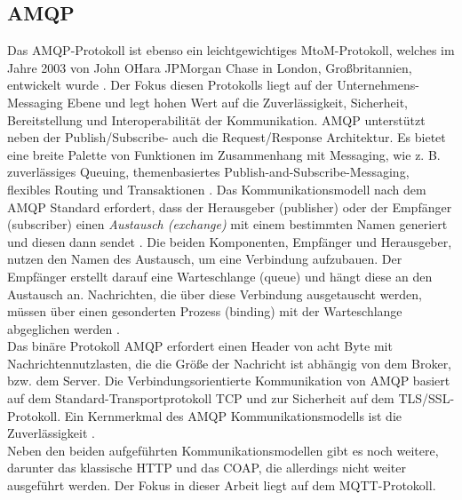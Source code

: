    \subsection{AMQP}
    \label{subsec:amqp}
        Das \ac{AMQP}-Protokoll ist ebenso ein leichtgewichtiges \acs{MtoM}-Protokoll, welches im Jahre 2003 von John O\'Hara JPMorgan Chase 
        in London, Großbritannien, entwickelt wurde \cite{Naik2017}. Der Fokus diesen Protokolls liegt auf der Unternehmens-Messaging Ebene 
        und legt hohen Wert auf die Zuverlässigkeit, Sicherheit, Bereitstellung und Interoperabilität der Kommunikation. \acs{AMQP} 
        unterstützt neben der Publish/Subscribe- auch die Request/Response Architektur. Es bietet eine breite Palette von 
        Funktionen im Zusammenhang mit Messaging, wie z. B. zuverlässiges Queuing, themenbasiertes Publish-and-Subscribe-Messaging, 
        flexibles Routing und Transaktionen \cite{Naik2017}. Das Kommunikationsmodell nach dem \acs{AMQP} Standard erfordert, dass der 
        Herausgeber (publisher) oder der Empfänger (subscriber) einen \textit{Austausch (exchange)} mit einem bestimmten Namen generiert 
        und diesen dann sendet \cite{Naik2017}. Die beiden Komponenten, Empfänger und Herausgeber, nutzen den Namen des Austausch, um eine 
        Verbindung aufzubauen. Der Empfänger erstellt darauf eine Warteschlange (queue) und hängt diese an den Austausch an. Nachrichten, die 
        über diese Verbindung ausgetauscht werden, müssen über einen gesonderten Prozess (binding) mit der Warteschlange abgeglichen werden 
        \cite{Naik2017}.
        \\ 
        Das binäre Protokoll \acs{AMQP} erfordert einen Header von acht Byte mit Nachrichtennutzlasten, die die Größe der Nachricht ist abhängig 
        von dem Broker, bzw. dem Server. Die Verbindungsorientierte Kommunikation von \acs{AMQP} basiert auf dem Standard-Transportprotokoll 
        \acs{TCP} und zur Sicherheit auf dem \acs{TLS}/\acs{SSL}-Protokoll. Ein Kernmerkmal des \acs{AMQP} Kommunikationsmodells ist die 
        Zuverlässigkeit \cite{Naik2017}. 
        \\
        \linebreak
        Neben den beiden aufgeführten Kommunikationsmodellen gibt es noch weitere, darunter das klassische \ac{HTTP} und das \ac{COAP}, die 
        allerdings nicht weiter ausgeführt werden. Der Fokus in dieser Arbeit liegt auf dem \acs{MQTT}-Protokoll. 
        
